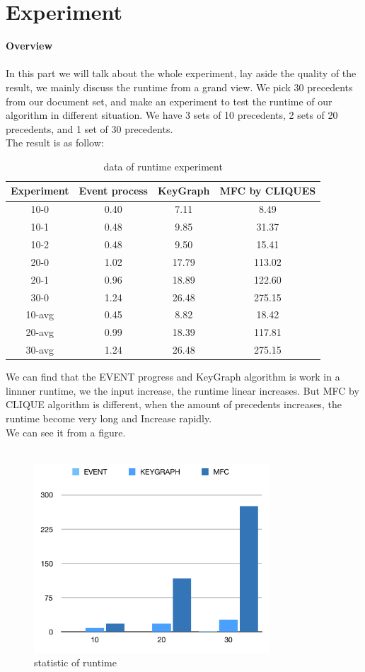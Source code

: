 \section{Experiment}
\textbf{Overview}
\\ \\
In this part we will talk about the whole experiment, lay aside the quality of the result, we mainly discuss the runtime from a grand view. We pick 30 precedents from our document set, and make an experiment to test the runtime of our algorithm in different situation. We have 3 sets of 10 precedents, 2 sets of 20 precedents, and 1 set of 30 precedents.\\
The result is as follow:\\
\begin{table}[!h]
\centering
\begin{tabular}{cccc}
\hline
Experiment&Event process&KeyGraph&MFC by CLIQUES\\
\hline
10-0&0.40&7.11&8.49\\
10-1&0.48&9.85&31.37\\
10-2&0.48&9.50&15.41\\
20-0&1.02&17.79&113.02\\
20-1&0.96&18.89&122.60\\
30-0&1.24&26.48&275.15\\
10-avg&0.45&8.82&18.42\\
20-avg&0.99&18.39&117.81\\
30-avg&1.24&26.48&275.15\\
\hline
\end{tabular}
\caption{data of runtime experiment}
\end{table}
We can find that the EVENT progress and KeyGraph algorithm is work in a linnner runtime, we the input increase, the runtime linear increases. But MFC by CLIQUE algorithm is different, when the amount of precedents increases, the runtime become very long and Increase rapidly.\\
 We can see it from a figure.\\ \\
\begin{figure}[!h]
\centering
\includegraphics[width=250pt]{./pictures/0403-0.png}
\caption{statistic of runtime}
\end{figure}
